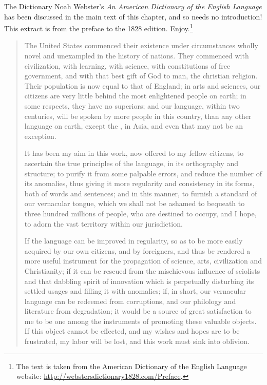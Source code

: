 \begin{texts}{The Dictionary}\label{LModE-Webster}
Noah Webster's \textit{An American Dictionary of the English Language} has been discussed in the main text of this chapter, and so needs no introduction! This extract is from the preface to the 1828 edition. Enjoy.\footnote{The text is taken from the American Dictionary of the English Language website: \url{http://webstersdictionary1828.com/Preface}.}

\begin{quote}
    \internallinenumbers*{}
    The United States commenced their existence under circumstances wholly novel and unexampled in the history of nations. They commenced with civilization, with learning, with science, with constitutions of free government, and with that best gift of God to man, the christian religion. Their population is now equal to that of England; in arts and sciences, our citizens are very little behind the most enlightened people on earth; in some respects, they have no superiors; and our language, within two centuries, will be spoken by more people in this country, than any other language on earth, except the , in Asia, and even that may not be an exception.
    
    It has been my aim in this work, now offered to my fellow citizens, to ascertain the true principles of the language, in its orthography and structure; to purify it from some palpable errors, and reduce the number of its anomalies, thus giving it more regularity and consistency in its forms, both of words and sentences; and in this manner, to furnish a standard of our vernacular tongue, which we shall not be ashamed to bequeath to three hundred millions of people, who are destined to occupy, and I hope, to adorn the vast territory within our jurisdiction.
    
    If the language can be improved in regularity, so as to be more easily acquired by our own citizens, and by foreigners, and thus be rendered a more useful instrument for the propagation of science, arts, civilization and Christianity; if it can be rescued from the mischievous influence of sciolists and that dabbling spirit of innovation which is perpetually disturbing its settled usages and filling it with anomalies; if, in short, our vernacular language can be redeemed from corruptions, and our philology and literature from degradation; it would be a source of great satisfaction to me to be one among the instruments of promoting these valuable objects. If this object cannot be effected, and my wishes and hopes are to be frustrated, my labor will be lost, and this work must sink into oblivion.
    

\end{quote}
\end{texts}

